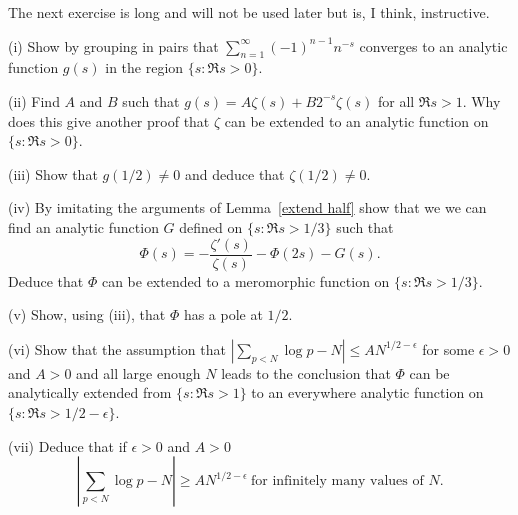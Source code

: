 The next exercise is long and will not be used later but is,
I think, instructive.
\begin{exercise} (i) Show by grouping in pairs
that $\sum_{n=1}^{\infty}(-1)^{n-1}n^{-s}$
converges to an analytic function $g(s)$ in the
region $\{s:\Re s>0\}$.

(ii) Find $A$ and $B$ such that $g(s)=A\zeta(s)+B2^{-s}\zeta(s)$
for all $\Re s>1$. Why does this give another proof
that $\zeta$ can be extended to an analytic function 
on $\{s:\Re s>0\}$.

(iii) Show that $g(1/2)\neq 0$ and deduce that $\zeta(1/2)\neq 0$.

(iv) By imitating the arguments of Lemma~\ref{extend half}
show that we we can find an analytic function $G$ defined
on $\{s:\Re s>1/3\}$ such that
\[\Phi(s)=-\frac{\zeta'(s)}{\zeta(s)}-\Phi(2s)-G(s).\]
Deduce that $\Phi$ can be extended to a meromorphic
function on $\{s:\Re s>1/3\}$. 

(v) Show, using (iii), that $\Phi$ has a pole at $1/2$.

(vi) Show that the assumption that 
$|\sum_{p<N}\log p -N|\leq A N^{1/2-\epsilon}$ for
some $\epsilon>0$ and $A>0$ and all large enough $N$
leads to the conclusion that
$\Phi$ can be analytically extended from $\{s:\Re s>1\}$
to an everywhere analytic function
on $\{s:\Re s>1/2-\epsilon\}$.

(vii) Deduce that if $\epsilon>0$ and $A>0$
\[|\sum_{p<N}\log p -N|\geq A N^{1/2-\epsilon}
\ \text{for infinitely many values of $N$.}\]
\end{exercise}

